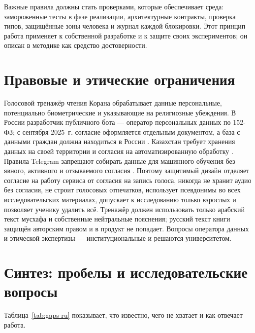 \documentclass[a4paper,14pt]{extarticle}
\begin{document}
\begin{keybox}[Вывод]
Важные правила должны стать проверками, которые обеспечивает среда: замороженные тесты в фазе
реализации, архитектурные контракты, проверка типов, защищённые зоны человека и журнал каждой
блокировки. Этот принцип работа применяет к собственной разработке и к защите своих экспериментов; он
описан в методике как средство достоверности.
\end{keybox}

\section{Правовые и этические ограничения}

Голосовой тренажёр чтения Корана обрабатывает данные персональные, потенциально биометрические и
указывающие на религиозные убеждения. В России разработчик публичного бота --- оператор персональных
данных по 152-ФЗ; с сентября 2025~г. согласие оформляется отдельным документом, а база с данными
граждан должна находиться в России \cite{SRC-036}. Казахстан требует хранения данных на своей
территории и согласия на автоматизированную обработку \cite{SRC-037}. Правила Telegram запрещают
собирать данные для машинного обучения без явного, активного и отзываемого согласия \cite{SRC-033}.
Поэтому защитимый дизайн отделяет согласие на работу сервиса от согласия на запись голоса, никогда не
хранит аудио без согласия, не строит голосовых отпечатков, использует псевдонимы во всех
исследовательских материалах, допускает к исследованию только взрослых и позволяет ученику удалить всё.
Тренажёр должен использовать только арабский текст мусхафа и собственные нейтральные пояснения;
русский текст книги защищён авторским правом и в продукт не попадает. Вопросы оператора данных и
этической экспертизы --- институциональные и решаются университетом.

\section{Синтез: пробелы и исследовательские вопросы}

Таблица~\ref{tab:gaps-ru} показывает, что известно, чего не хватает и как отвечает работа.
\end{document}
